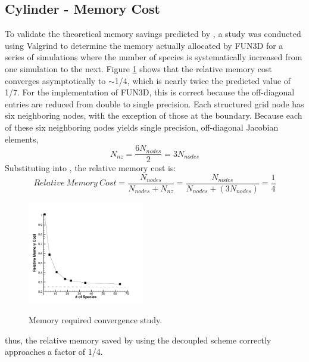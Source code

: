 
\subsection{Cylinder - Memory Cost}

To validate the theoretical memory savings predicted by , a
study was conducted using Valgrind\cite{valgrind} to determine the memory
actually allocated by FUN3D for a series of simulations where the number of
species is systematically increased from one simulation to the next.  Figure
\ref{mem_req} shows that the relative memory cost converges asymptotically to
$\sim$1/4, which is nearly twice the predicted value of 1/7.  For the
implementation of FUN3D, this is correct because the off-diagonal entries are
reduced from double to single precision.  Each structured grid node has six
neighboring nodes, with the exception of those at the boundary.  Because each of
these six neighboring nodes yields single precision, off-diagonal Jacobian
elements, 
\begin{equation} 
  N_{nz} = \frac{6N_{nodes}}{2} = 3N_{nodes}
  \label{f3d_off_diag} 
\end{equation} 
Substituting  into , the relative memory
cost is:
\begin{equation} 
  Relative\ Memory\ Cost = 
  \frac{N_{nodes}}{N_{nodes} + N_{nz}} =
  \frac{N_{nodes}}{N_{nodes} + (3N_{nodes})}=\frac{1}{4}
\end{equation}
\begin{figure}[h] 
  \begin{center} 
    \includegraphics[width=0.45\textwidth]{figures/scitech/mem_req}
    \caption{Memory required convergence study.} 
    \vspace{-2em}
    \label{mem_req}
    \end{center} 
\end{figure}
thus, the relative memory saved by using the decoupled scheme correctly
approaches a factor of 1/4.

